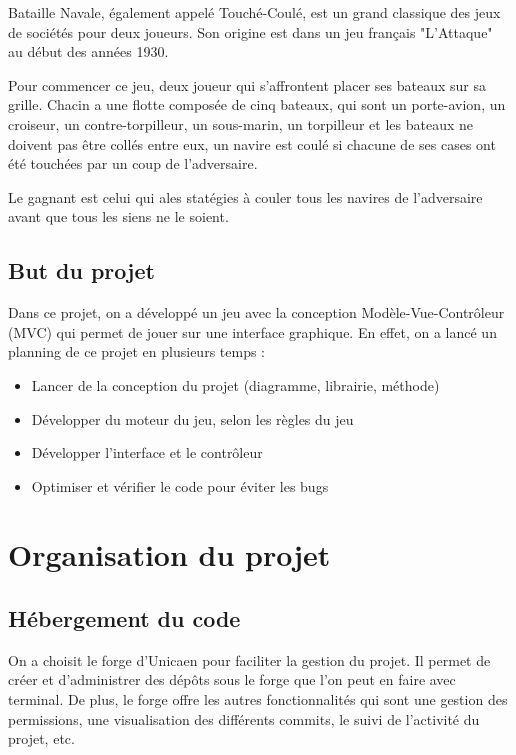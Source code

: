 \documentclass[12pt, pdflatex]{article}
\begin{document}
    Bataille Navale\cite{wiki}, également appelé Touché-Coulé, est un grand classique des jeux de sociétés pour deux joueurs. Son origine est dans un jeu français "L'Attaque" au début des années 1930.

    Pour commencer ce jeu, deux joueur qui s'affrontent placer ses bateaux sur sa grille. Chacin a une flotte composée de cinq bateaux, qui sont un porte-avion, un croiseur, un contre-torpilleur, un sous-marin, un torpilleur et les bateaux ne doivent pas être collés entre eux, un navire est coulé si chacune de ses cases ont été touchées par un coup de l'adversaire.
    
    Le gagnant est celui qui ales statégies à couler tous les navires de l'adversaire avant que tous les siens ne le soient.

    \subsection{But du projet}
    Dans ce projet, on a développé un jeu avec la conception Modèle-Vue-Contrôleur (MVC) qui permet de jouer sur une interface graphique. En effet, on a lancé un planning de ce projet en plusieurs temps :

    \begin{itemize}
        \item Lancer de la conception du projet (diagramme, librairie, méthode)
        \item Développer du moteur du jeu, selon les règles du jeu
        \item Développer l'interface et le contrôleur
        \item Optimiser et vérifier le code pour éviter les bugs
    \end{itemize}

\section{Organisation du projet}
    \subsection{Hébergement du code}
    On a choisit le forge d'Unicaen pour faciliter la gestion du projet. Il permet de créer et d'administrer des dépôts sous le forge que l'on peut en faire avec terminal. De plus, le forge offre les autres fonctionnalités qui sont une gestion des permissions, une visualisation des différents commits, le suivi de l’activité du projet, etc. 
\end{document}
